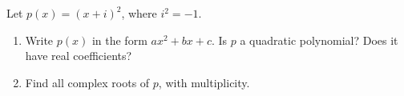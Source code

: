 Let $p(x)=(x+i)^2$, where $i^2=-1$.
\begin{enumerate}
\item[(a)] Write $p(x)$ in the form $ax^2+bx+c$. Is $p$ a quadratic polynomial? Does it have real coefficients?
\item[(b)] Find all complex roots of $p$, with multiplicity.
\end{enumerate}

